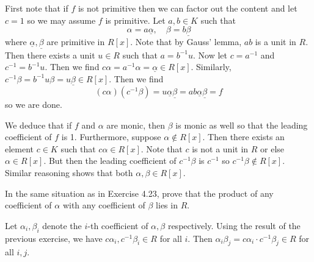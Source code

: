 \documentclass[../../master.tex]{subfiles}
\begin{document}
    \begin{solution}
        First note that if $f$ is not primitive then we can factor out the
        content and let $c = 1$ so we may assume $f$ is primitive. Let $a, b \in
        K$ such that
        \[
            \alpha = a \underline{\alpha}, \quad \beta = b \underline{\beta}
        \] 
        where $\underline{\alpha}, \underline{\beta}$ are primitive in $R[x]$.
        Note that by Gauss' lemma, $ab$ is a unit in $R$. Then there exists a
        unit $u \in R$ such that $a = b^{-1}u$. Now let $c = a^{-1}$ and $c^{-1}
        = b^{-1}u$. Then we find $c \alpha = a^{-1} \alpha = \underline{\alpha}
        \in R[x]$. Similarly, $c^{-1} \beta = b^{-1}u \beta = u
        \underline{\beta} \in R[x]$. Then we find
        \[
            (c \alpha) (c^{-1} \beta) = u \underline{\alpha} \underline{\beta} =
            ab \underline{\alpha} \underline{\beta} = f
        \] 
        so we are done.

        We deduce that if $f$ and $\alpha$ are monic, then $\beta$ is monic as
        well so that the leading coefficient of $f$ is 1. Furthermore, suppose
        $\alpha \notin R[x]$. Then there exists an element $c \in K$ such that
        $c \alpha \in R[x]$. Note that $c$ is not a unit in $R$ or else $\alpha
        \in R[x]$. But then the leading coefficient of $c^{-1} \beta$ is
        $c^{-1}$ so $c^{-1} \beta \notin R[x]$. Similar reasoning shows that
        both $\alpha, \beta \in R[x]$.
    \end{solution}

    \begin{problem}
        In the same situation as in Exercise 4.23, prove that the product of any
        coefficient of $\alpha$ with any coefficient of $\beta$ lies in $R$.
    \end{problem}

    \begin{solution}
        Let $\alpha_i, \beta_i$ denote the $i$-th coefficient of $\alpha,
        \beta$ respectively. Using the result of the previous exercise, we have
        $c\alpha_i, c^{-1}\beta_i \in R$ for all $i$. Then $\alpha_i \beta_j = c
        \alpha_i \cdot c^{-1} \beta_j \in R$ for all $i, j$.
    \end{solution}
\end{document}
